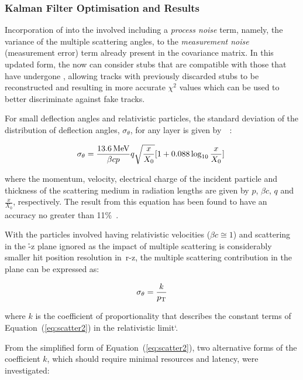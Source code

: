 \subsubsection{Kalman Filter Optimisation and Results}\label{subsubsec:lowPtOptKF}
Incorporation of \MS into the \KF involved including a \emph{process noise} term, namely, the variance of the multiple scattering angles, to the \emph{measurement noise} (\ie measurement error) term already present in the \KF covariance matrix.
In this updated form, the \KF now can consider stubs that are compatible with those that have undergone \MS, allowing tracks with previously discarded stubs to be reconstructed and resulting in more accurate $\chi^{2}$ values which can be used to better discriminate against fake tracks.

For small deflection angles and relativistic particles, the standard deviation of the distribution of deflection angles, $\sigma_{\theta}$, for any layer is given by~\cite{Lynch:1990sq}~:

\begin{equation}
\sigma_{\theta} = \frac{13.6\,\text{Me\hspace{-.08em}V}}{\beta c p} q \sqrt{\frac{x}{X_{0}}} [1 + 0.088 \log_{10}{\frac{x}{X_{0}}}]  \;
\label{eq:scatter1}
\end{equation}

where the momentum, velocity, electrical charge of the incident particle and thickness of the scattering medium in radiation lengths are given by $p$, $\beta c$, $q$ and $\frac{x}{X_{0}}$, respectively.
The result from this equation has been found to have an accuracy no greater than 11\%~\cite{Lynch:1990sq}.

With the particles involved having relativistic velocities (\ie $\beta c \cong 1$) and scattering in the \r-z plane ignored as the impact of multiple scattering is considerably smaller hit position resolution in\ r-z, the multiple scattering contribution in the \rphi plane can be expressed as:

\begin{equation}
\sigma_{\theta} = \frac{k}{p_{\mathrm{T}}}
\label{eq:scatter2}
\end{equation}

where $k$ is the coefficient of proportionality that describes the constant terms of Equation~(\ref{eq:scatter2}) in the relativistic limit`.

From the simplified form of Equation~(\ref{eq:scatter2}), two alternative forms of the coefficient $k$, which should require minimal resources and latency, were investigated:


